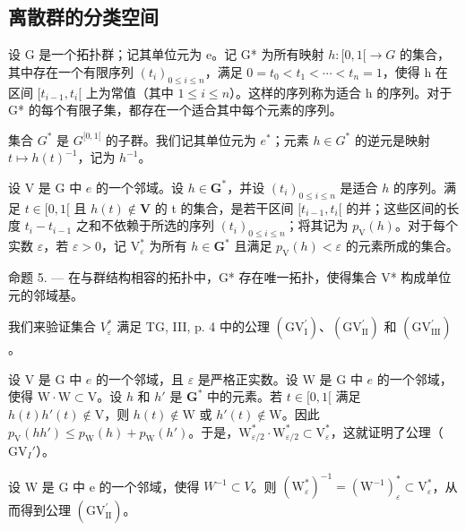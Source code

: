 \subsection{离散群的分类空间}

设 G 是一个拓扑群；记其单位元为 e。记 G* 为所有映射 \(h\colon[0,1[ \to G\) 的集合，其中存在一个有限序列 \((t_{i})_{0\leqslant i\leqslant n}\)，满足 \(0=t_{0}<t_{1}<\cdots<t_{n}=1\)，使得 h 在区间 \([t_{i-1},t_{i}[\) 上为常值（其中 \(1\leqslant i\leqslant n\)）。这样的序列称为适合 h 的序列。对于 G* 的每个有限子集，都存在一个适合其中每个元素的序列。

集合 \(G^{*}\) 是 \(G^{[0,1[}\) 的子群。我们记其单位元为 \(e^{*}\)；元素 \(h \in G^{*}\) 的逆元是映射 \(t \mapsto h(t)^{-1}\)，记为 \(h^{-1}\)。

设 V 是 G 中 \(e\) 的一个邻域。设 \(h \in \mathbf{G}^*\)，并设 \((t_i)_{0 \leqslant i \leqslant n}\) 是适合 \(h\) 的序列。满足 \(t \in [0,1[\) 且 \(h(t) \notin \mathbf{V}\) 的 t 的集合，是若干区间 \([t_{i-1}, t_i[\) 的并；这些区间的长度 \(t_i - t_{i-1}\) 之和不依赖于所选的序列 \((t_i)_{0 \leqslant i \leqslant n}\)；将其记为 \(p_{\mathrm{V}}(h)\)。对于每个实数 \(\varepsilon\)，若 \(\varepsilon > 0\)，记 \(\mathrm{V}_{\varepsilon}^*\) 为所有 \(h \in \mathbf{G}^*\) 且满足 \(p_{\mathrm{V}}(h) < \varepsilon\) 的元素所成的集合。

命题 5. --- 在与群结构相容的拓扑中，G* 存在唯一拓扑，使得集合 V* 构成单位元的邻域基。

我们来验证集合 \(V_{\varepsilon}^{*}\) 满足 TG, III, p. 4 中的公理 \((\mathrm{GV}_{\mathrm{I}}^{\prime})\)、\((\mathrm{GV}_{\mathrm{II}}^{\prime})\) 和 \((\mathrm{GV}_{\mathrm{III}}^{\prime})\)。

设 V 是 G 中 \(e\) 的一个邻域，且 \(\varepsilon\) 是严格正实数。设 W 是 G 中 \(e\) 的一个邻域，使得 \(\mathrm{W} \cdot \mathrm{W} \subset \mathrm{V}\)。设 \(h\) 和 \(h'\) 是 \(\mathbf{G}^*\) 中的元素。若 \(t \in [0,1[\) 满足 \(h(t)h'(t) \notin \mathrm{V}\)，则 \(h(t) \notin \mathrm{W}\) 或 \(h'(t) \notin \mathrm{W}\)。因此 \(p_{\mathrm{V}}(hh') \leqslant p_{\mathrm{W}}(h) + p_{\mathrm{W}}(h')\)。于是，\(\mathrm{W}_{\varepsilon/2}^* \cdot \mathrm{W}_{\varepsilon/2}^* \subset \mathrm{V}_{\varepsilon}^*\)，这就证明了公理（\(\mathrm{GV}_I'\)）。

设 W 是 G 中 e 的一个邻域，使得 \(W^{-1} \subset V\)。则 \((\mathrm{W}_{\varepsilon}^{*})^{-1} = (\mathrm{W}^{-1})_{\varepsilon}^{*} \subset \mathrm{V}_{\varepsilon}^{*}\)，从而得到公理 \((\mathrm{GV}_{\mathrm{II}}^{\prime})\)。


